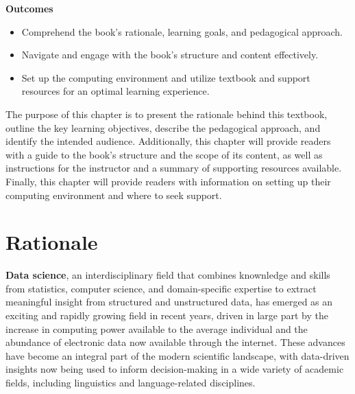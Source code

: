 \documentclass[
  letterpaper,
  DIV=11,
  numbers=noendperiod]{scrreprt}
\providecommand{\tightlist}{%
  \setlength{\itemsep}{0pt}\setlength{\parskip}{0pt}}\usepackage{longtable,booktabs,array}
\theoremstyle{definition}
\theoremstyle{remark}
\begin{document}
\begin{tcolorbox}[enhanced jigsaw, leftrule=.75mm, colframe=quarto-callout-color-frame, colback=white, rightrule=.15mm, opacityback=0, arc=.35mm, breakable, bottomrule=.15mm, left=2mm, toprule=.15mm]

\textbf{ Outcomes}

\begin{itemize}
\tightlist
\item
  Comprehend the book's rationale, learning goals, and pedagogical
  approach.
\item
  Navigate and engage with the book's structure and content effectively.
\item
  Set up the computing environment and utilize textbook and support
  resources for an optimal learning experience.
\end{itemize}

\end{tcolorbox}

The purpose of this chapter is to present the rationale behind this
textbook, outline the key learning objectives, describe the pedagogical
approach, and identify the intended audience. Additionally, this chapter
will provide readers with a guide to the book's structure and the scope
of its content, as well as instructions for the instructor and a summary
of supporting resources available. Finally, this chapter will provide
readers with information on setting up their computing environment and
where to seek support.

\section*{Rationale}\label{sec-p-rationale}


\textbf{Data science}, an interdisciplinary field
that combines knownledge and skills from statistics, computer science,
and domain-specific expertise to extract meaningful insight from
structured and unstructured data, has emerged as an exciting and rapidly
growing field in recent years, driven in large part by the increase in
computing power available to the average individual and the abundance of
electronic data now available through the internet. These advances have
become an integral part of the modern scientific landscape, with
data-driven insights now being used to inform decision-making in a wide
variety of academic fields, including linguistics and language-related
disciplines.
\end{document}
